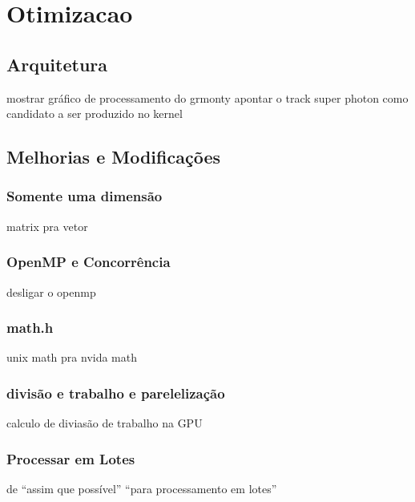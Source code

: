 \chapter{Otimizacao}
\label{cap:otimizacao}

\section{Arquitetura}
  mostrar gráfico de processamento do grmonty
  apontar o track super photon como candidato a ser produzido no kernel

\section{Melhorias e Modificações}
  \subsection{Somente uma dimensão}
    matrix pra vetor

  \subsection{OpenMP e Concorrência}
    desligar o openmp

  \subsection{math.h}
    unix math pra nvida math

  \subsection{divisão e trabalho e parelelização}
    calculo de diviasão de trabalho na GPU

  \subsection{Processar em Lotes}
    de ``assim que possível'' ``para processamento em lotes''
